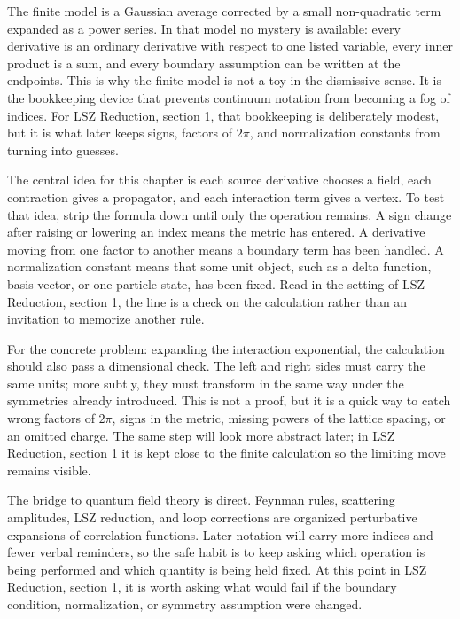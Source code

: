 The finite model is a Gaussian average corrected by a small non-quadratic term expanded as a power series.  In that model no mystery is available: every derivative is an ordinary derivative with respect to one listed variable, every inner product is a sum, and every boundary assumption can be written at the endpoints.  This is why the finite model is not a toy in the dismissive sense.  It is the bookkeeping device that prevents continuum notation from becoming a fog of indices.  For LSZ Reduction, section 1, that bookkeeping is deliberately modest, but it is what later keeps signs, factors of \(2\pi\), and normalization constants from turning into guesses.

The central idea for this chapter is each source derivative chooses a field, each contraction gives a propagator, and each interaction term gives a vertex.  To test that idea, strip the formula down until only the operation remains.  A sign change after raising or lowering an index means the metric has entered.  A derivative moving from one factor to another means a boundary term has been handled.  A normalization constant means that some unit object, such as a delta function, basis vector, or one-particle state, has been fixed.  Read in the setting of LSZ Reduction, section 1, the line is a check on the calculation rather than an invitation to memorize another rule.

For the concrete problem: expanding the interaction exponential, the calculation should also pass a dimensional check.  The left and right sides must carry the same units; more subtly, they must transform in the same way under the symmetries already introduced.  This is not a proof, but it is a quick way to catch wrong factors of \(2\pi\), signs in the metric, missing powers of the lattice spacing, or an omitted charge.  The same step will look more abstract later; in LSZ Reduction, section 1 it is kept close to the finite calculation so the limiting move remains visible.

The bridge to quantum field theory is direct.  Feynman rules, scattering amplitudes, LSZ reduction, and loop corrections are organized perturbative expansions of correlation functions.  Later notation will carry more indices and fewer verbal reminders, so the safe habit is to keep asking which operation is being performed and which quantity is being held fixed.  At this point in LSZ Reduction, section 1, it is worth asking what would fail if the boundary condition, normalization, or symmetry assumption were changed.

